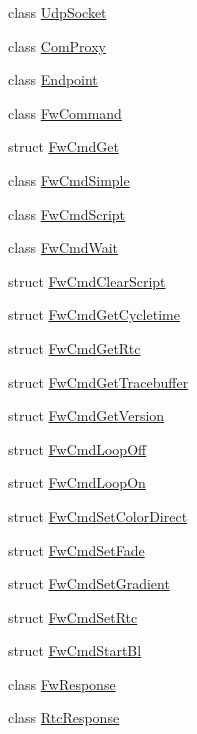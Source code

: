 \begin{DoxyCompactItemize}
\item 
class \hyperlink{class_wy_light_1_1_udp_socket}{Udp\-Socket}
\item 
class \hyperlink{class_wy_light_1_1_com_proxy}{Com\-Proxy}
\item 
class \hyperlink{class_wy_light_1_1_endpoint}{Endpoint}
\item 
class \hyperlink{class_wy_light_1_1_fw_command}{Fw\-Command}
\item 
struct \hyperlink{struct_wy_light_1_1_fw_cmd_get}{Fw\-Cmd\-Get}
\item 
class \hyperlink{class_wy_light_1_1_fw_cmd_simple}{Fw\-Cmd\-Simple}
\item 
class \hyperlink{class_wy_light_1_1_fw_cmd_script}{Fw\-Cmd\-Script}
\item 
class \hyperlink{class_wy_light_1_1_fw_cmd_wait}{Fw\-Cmd\-Wait}
\item 
struct \hyperlink{struct_wy_light_1_1_fw_cmd_clear_script}{Fw\-Cmd\-Clear\-Script}
\item 
struct \hyperlink{struct_wy_light_1_1_fw_cmd_get_cycletime}{Fw\-Cmd\-Get\-Cycletime}
\item 
struct \hyperlink{struct_wy_light_1_1_fw_cmd_get_rtc}{Fw\-Cmd\-Get\-Rtc}
\item 
struct \hyperlink{struct_wy_light_1_1_fw_cmd_get_tracebuffer}{Fw\-Cmd\-Get\-Tracebuffer}
\item 
struct \hyperlink{struct_wy_light_1_1_fw_cmd_get_version}{Fw\-Cmd\-Get\-Version}
\item 
struct \hyperlink{struct_wy_light_1_1_fw_cmd_loop_off}{Fw\-Cmd\-Loop\-Off}
\item 
struct \hyperlink{struct_wy_light_1_1_fw_cmd_loop_on}{Fw\-Cmd\-Loop\-On}
\item 
struct \hyperlink{struct_wy_light_1_1_fw_cmd_set_color_direct}{Fw\-Cmd\-Set\-Color\-Direct}
\item 
struct \hyperlink{struct_wy_light_1_1_fw_cmd_set_fade}{Fw\-Cmd\-Set\-Fade}
\item 
struct \hyperlink{struct_wy_light_1_1_fw_cmd_set_gradient}{Fw\-Cmd\-Set\-Gradient}
\item 
struct \hyperlink{struct_wy_light_1_1_fw_cmd_set_rtc}{Fw\-Cmd\-Set\-Rtc}
\item 
struct \hyperlink{struct_wy_light_1_1_fw_cmd_start_bl}{Fw\-Cmd\-Start\-Bl}
\item 
class \hyperlink{class_wy_light_1_1_fw_response}{Fw\-Response}
\item 
class \hyperlink{class_wy_light_1_1_rtc_response}{Rtc\-Response}

\end{DoxyCompactItemize}
